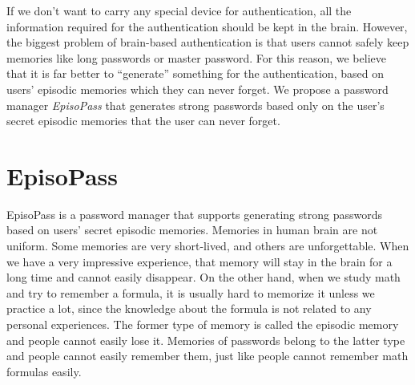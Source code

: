 \documentclass{sigchi}
\begin{document}
If we don't want to carry any special device for authentication,
all the information required for the authentication should be
kept in the brain.
%
However, the biggest problem of brain-based authentication is that
users cannot safely keep memories like long passwords or master password.
For this reason, we believe that
it is far better to ``generate'' something for the authentication,
based on users' episodic memories which they can never forget.
%
%
We propose a password manager \textit{EpisoPass} that generates strong passwords
based only on the user's secret episodic memories that the user can never forget.

\section{EpisoPass}

EpisoPass is a password manager that supports generating
strong passwords based on users' secret episodic memories.
%
%
Memories in human brain are not uniform.
Some memories are very short-lived, and others are unforgettable.
When we have a very impressive experience,
that memory will stay in the brain for a long time and
cannot easily disappear.
On the other hand, when we study math and try to remember a formula,
it is usually hard to memorize it unless we practice a lot,
since the knowledge about the formula is not related to
any personal experiences.
The former type of memory is called the episodic memory and
people cannot easily lose it.
Memories of passwords belong to the latter type and
people cannot easily remember them, just like people cannot
remember math formulas easily.
%
\end{document}
